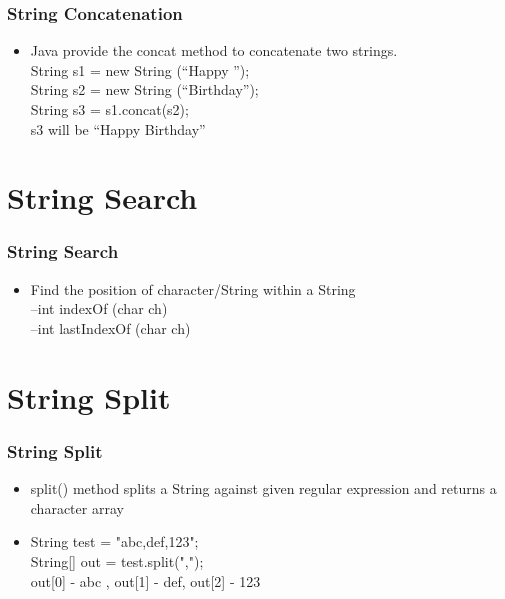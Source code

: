 \documentclass{beamer}
\begin{document}
\begin{frame}
\frametitle{String Concatenation}
\begin{itemize}
\item Java provide the concat method to concatenate two
strings.\\
String s1 = new String (“Happy ”);\\
String s2 = new String (“Birthday”);\\
String s3 = s1.concat(s2);\\
s3 will be “Happy Birthday”\\
\end{itemize}


\end{frame}


\section{String Search}

\begin{frame}
\frametitle{String Search}
\begin{itemize}
\item Find the position of character/String within a String\\
–int indexOf (char ch)\\
–int lastIndexOf (char ch)\\
\end{itemize}
\end{frame}


\section{String Split}

\begin{frame}
\frametitle{String Split}
\begin{itemize}
\item split() method splits a String against given regular
expression and returns a character array
\item String test = "abc,def,123";\\
String[] out = test.split(",");\\
out[0] - abc , out[1] - def, out[2] - 123
\end{itemize}
\end{frame}
\end{document}
